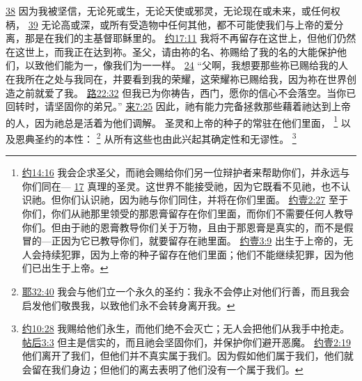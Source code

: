 \documentclass[12pt, a4paper, oneside]{ctexart}
\begin{document}
{		\href{https://biblehub.com/romans/8-38.htm}{38} 因为我被坚信，无论死或生，无论天使或邪灵，无论现在或未来，或任何权柄，
		\href{https://biblehub.com/romans/8-39.htm}{39} 无论高或深，或所有受造物中任何其他，都不可能使我们与上帝的爱分离，那是在我们的主基督耶稣里的。
		\href{https://biblehub.com/john/17-11.htm}{约17:11} 我将不再留存在这世上，但他们仍然在这世上，而我正在达到祢。圣父，请由祢的名、祢赐给了我的名的大能保护他们，以致他们能为一，像我们为一一样。
		\href{https://biblehub.com/john/17-24.htm}{24} “父啊，我想要那些祢已赐给我的人在我所在之处与我同在，并要看到我的荣耀，这荣耀祢已赐给我，因为祢在世界创造之前就爱了我。
		\href{https://biblehub.com/luke/22-32.htm}{路22:32} 但我已为你祷告，西门，愿你的信心不会落空。当你已回转时，请坚固你的弟兄。”
		\href{https://biblehub.com/hebrews/7-25.htm}{来7:25} 因此，祂有能力完备拯救那些藉着祂达到上帝的人，因为祂总是活着为他们调解。
	}
	圣灵和上帝的种子的常驻在他们里面，
	\footnote {
		\href{https://biblehub.com/john/14-16.htm}{约14:16} 我会企求圣父，而祂会赐给你们另一位辩护者来帮助你们，并永远与你们同在---
		\href{https://biblehub.com/john/14-17.htm}{17} 真理的圣灵。这世界不能接受祂，因为它既看不见祂，也不认识祂。但你们认识祂，因为祂与你们同住，并将在你们里面。
		\href{https://biblehub.com/1_john/2-27.htm}{约壹2:27} 至于你们，你们从祂那里领受的那恩膏留存在你们里面，而你们不需要任何人教导你们。但由于祂的恩膏教导你们关于万物，且由于那恩膏是真实的，而不是假冒的---正因为它已教导你们，就要留存在祂里面。
		\href{https://biblehub.com/1_john/3-9.htm}{约壹3:9} 出生于上帝的，无人会持续犯罪，因为上帝的种子留存在他们里面；他们不能继续犯罪，因为他们已出生于上帝。
	}
	以及恩典圣约的本性：
	\footnote {
		\href{https://biblehub.com/jeremiah/32-40.htm}{耶32:40} 我会与他们立一个永久的圣约：我永不会停止对他们行善，而且我会启发他们敬畏我，以致他们永不会转身离开我。
	}
	从所有这些也由此兴起其确定性和无谬性。
	\footnote {
		\href{https://biblehub.com/john/10-28.htm}{约10:28} 我赐给他们永生，而他们绝不会灭亡；无人会把他们从我手中抢走。
		\href{https://biblehub.com/2_thessalonians/3-3.htm}{帖后3:3} 但主是信实的，而且祂会坚固你们，并保护你们避开恶魔。
		\href{https://biblehub.com/1_john/2-19.htm}{约壹2:19} 他们离开了我们，但他们并不真实属于我们。因为假如他们属于我们，他们就会留在我们身边；但他们的离去表明了他们没有一个属于我们。
	}
\end{document}
